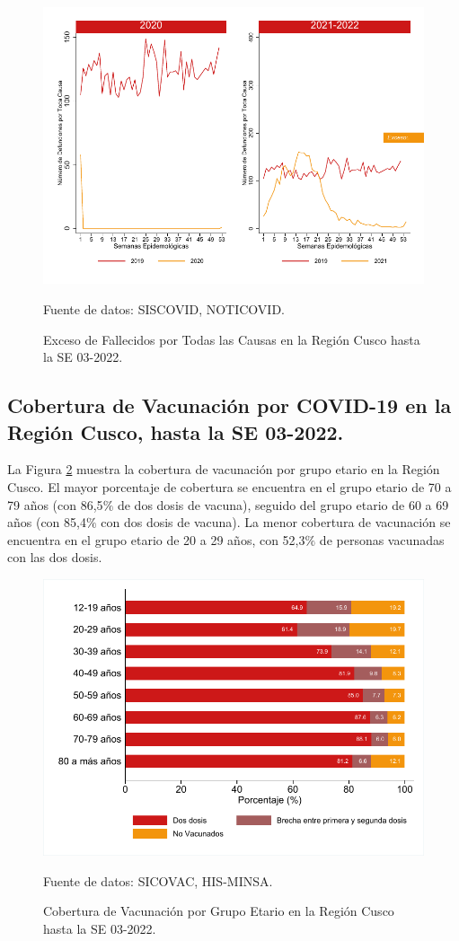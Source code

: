 \documentclass[12pt,a4paper,openany]{book}
\begin{document}
	\begin{figure}[h]
	\caption{Exceso de Fallecidos por Todas las Causas en la Región Cusco hasta la SE 03-2022.}\label{fig:exceso_regional}
	\begin{center}
		\includegraphics[width=0.85\linewidth]{../figuras/exceso_region.pdf}
	\end{center}
	{\footnotesize {Fuente de datos: SISCOVID, NOTICOVID.}}
	\end{figure}
\clearpage

	\subsection*{Cobertura de Vacunación por COVID-19 en la Región Cusco, hasta la SE 03-2022.}
\noindent La Figura \ref{fig:vacuna_edad} muestra la cobertura de vacunación por grupo etario en la Región Cusco. El mayor porcentaje de cobertura se encuentra en el grupo etario de 70 a 79 años (con 86,5$\%$ de dos dosis de vacuna), seguido del grupo etario de 60 a 69 años  (con 85,4$\%$ con dos dosis de vacuna). La menor cobertura de vacunación se encuentra en el grupo etario de 20 a 29 años, con 52,3$\%$ de personas vacunadas con las dos dosis. 

\begin{figure}[h]
	\caption{Cobertura de Vacunación por Grupo Etario en la Región Cusco hasta la SE 03-2022. }\label{fig:vacuna_edad}
	\begin{center}
		\includegraphics[width=0.65\linewidth]{../figuras/vacunacion_grupo_edad.pdf}
	\end{center}
	{\footnotesize {Fuente de datos: SICOVAC, HIS-MINSA.}}
\end{figure}
\end{document}
